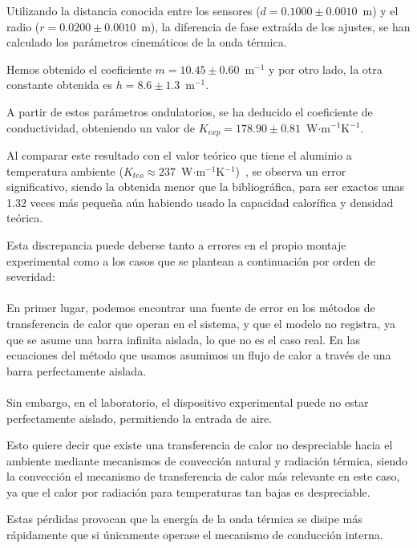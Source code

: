 \documentclass[a4paper,11pt]{article}
\begin{document}
Utilizando la distancia conocida entre los sensores ($d = 0.1000 \pm 0.0010$~m) y el radio ($r = 0.0200 \pm 0.0010$~m), la diferencia de fase extraída de los ajustes, se han calculado los parámetros cinemáticos de la onda térmica. 

Hemos obtenido el coeficiente $m = 10.45 \pm 0.60$~m$^{-1}$ y por otro lado, la otra constante obtenida es $h = 8.6 \pm 1.3$~m$^{-1}$. 

A partir de estos parámetros ondulatorios, se ha deducido el coeficiente de conductividad, obteniendo un valor de $K_{exp} = 178.90 \pm 0.81$~W$\cdot$m$^{-1}$K$^{-1}$. 

Al comparar este resultado con el valor teórico que tiene el aluminio a temperatura ambiente ($K_{teo} \approx 237$~W$\cdot$m$^{-1}$K$^{-1}$)~\cite{Lunn2025}, se observa un error significativo, siendo la obtenida menor que la bibliográfica, para ser exactos unas 1.32 veces más pequeña aún habiendo usado la capacidad calorífica y densidad teórica.

Esta discrepancia puede deberse tanto a errores en el propio montaje experimental como a los casos que se plantean a continuación por orden de severidad:
\paragraph{}
En primer lugar, podemos encontrar una fuente de error en los métodos de transferencia de calor que operan en el sistema, y que el modelo no registra, ya que se asume una barra infinita aislada, lo que no es el caso real. En las ecuaciones del método que usamos asumimos un flujo de calor a través de una barra perfectamente aislada. 
\paragraph{}
Sin embargo, en el laboratorio, el dispositivo experimental puede no estar perfectamente aislado, permitiendo la entrada de aire. 

Esto quiere decir que existe una transferencia de calor no despreciable hacia el ambiente mediante mecanismos de convección natural y radiación térmica, siendo la convección el mecanismo de transferencia de calor más relevante en este caso, ya que el calor por radiación para temperaturas tan bajas es despreciable.

Estas pérdidas provocan que la energía de la onda térmica se disipe más rápidamente que si únicamente operase el mecanismo de conducción interna. 
\end{document}
